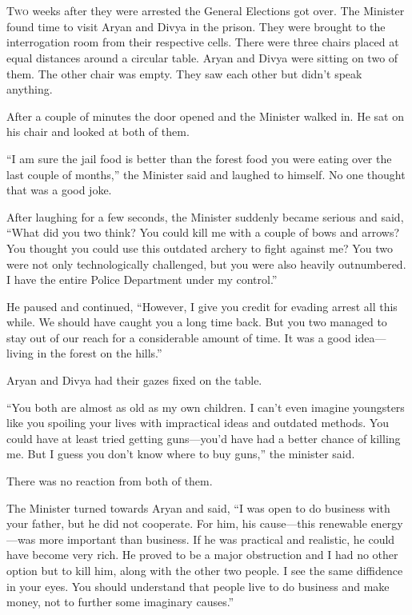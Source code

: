\chapter{}

\lettrine{T}{wo} weeks after they were arrested the General Elections got over. The Minister
found time to visit Aryan and Divya in the prison. They were brought to the
interrogation room from their respective cells. There were three chairs placed
at equal distances around a circular table. Aryan and Divya were sitting on two
of them. The other chair was empty. They saw each other but didn't speak
anything.

After a couple of minutes the door opened and the Minister walked in. He sat on
his chair and looked at both of them.

“I am sure the jail food is better than the forest food you were eating over the
last couple of months,” the Minister said and laughed to himself. No one thought
that was a good joke.

After laughing for a few seconds, the Minister suddenly became serious and said,
“What did you two think? You could kill me with a couple of bows and arrows? You
thought you could use this outdated archery to fight against me? You two were
not only technologically challenged, but you were also heavily outnumbered. I
have the entire Police Department under my control.”

He paused and continued, “However, I give you credit for evading arrest all this
while. We should have caught you a long time back. But you two managed to stay
out of our reach for a considerable amount of time. It was a good idea—living
in the forest on the hills.”

Aryan and Divya had their gazes fixed on the table.

“You both are almost as old as my own children. I can't even imagine youngsters
like you spoiling your lives with impractical ideas and outdated methods. You
could have at least tried getting guns—you'd have had a better chance of
killing me. But I guess you don't know where to buy guns,” the minister said.

There was no reaction from both of them.

The Minister turned towards Aryan and said, “I was open to do business with your
father, but he did not cooperate. For him, his cause—this renewable energy—was
more important than business. If he was practical and realistic, he could
have become very rich. He proved to be a major obstruction and I had no other
option but to kill him, along with the other two people. I see the same
diffidence in your eyes. You should understand that people live to do business
and make money, not to further some imaginary causes.”

